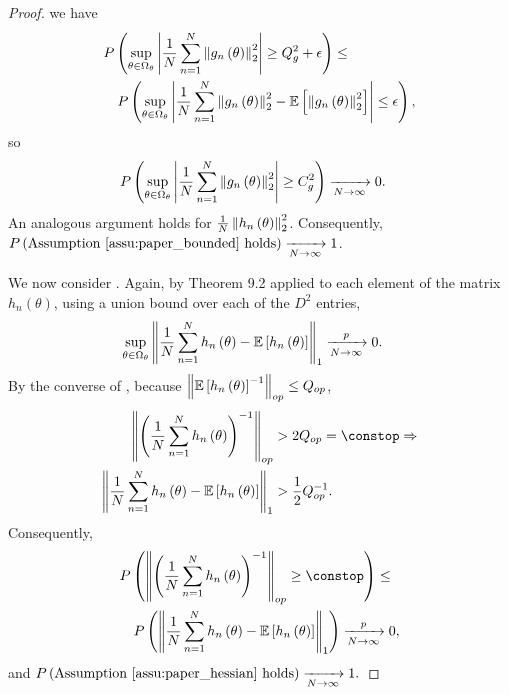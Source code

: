 \begin{proof}
we have
\begin{align*}
 & P\left(\sup_{\theta\in\Omega_{\theta}}\left|\frac{1}{N}\sum_{n=1}^{N}\left\Vert g_{n}\left(\theta\right)\right\Vert_{2}^{2}\right|\ge Q_{g}^{2}+\epsilon\right)\le\\
 & \quad P\left(\sup_{\theta\in\Omega_{\theta}}\left|\frac{1}{N}\sum_{n=1}^{N}\left\Vert g_{n}\left(\theta\right)\right\Vert_{2}^{2}-\mathbb{E}\left[\left\Vert g_{n}\left(\theta\right)\right\Vert_{2}^{2}\right]\right|\le\epsilon\right),
\end{align*}
so
\begin{align*}
P\left(\sup_{\theta\in\Omega_{\theta}}\left|\frac{1}{N}\sum_{n=1}^{N}\left\Vert g_{n}\left(\theta\right)\right\Vert_{2}^{2}\right|\ge C_{g}^{2}\right) & \xrightarrow[N\rightarrow\infty]{}0.
\end{align*}
An analogous argument holds for $\frac{1}{N}\left\Vert h_{n}\left(\theta\right)\right\Vert_{2}^{2}$.
Consequently, $P\left(\textrm{Assumption \ref{assu:paper_bounded} holds}\right)\xrightarrow[N\rightarrow\infty]{}1$.

We now consider . Again, by \citet{keener:2011:theoretical} Theorem 9.2
applied to each element of the matrix $h_{n}\left(\theta\right)$,
using a union bound over each of the $D^{2}$ entries,
\begin{align*}
\sup_{\theta\in\Omega_{\theta}}\left\Vert \frac{1}{N}\sum_{n=1}^{N}h_{n}\left(\theta\right)-\mathbb{E}\left[h_{n}\left(\theta\right)\right]\right\Vert_{1} & \xrightarrow[N\rightarrow\infty]{p}0.
\end{align*}
By the converse of , because
$\left\Vert \mathbb{E}\left[h_{n}\left(\theta\right)\right]^{-1}\right\Vert_{op}\le Q_{op}$,
\begin{align*}
\norm{\left(\frac{1}{N}\sum_{n=1}^{N}h_{n}\left(\theta\right)\right)^{-1}}_{op} & >2Q_{op}=\constop\Rightarrow\\
\norm{\frac{1}{N}\sum_{n=1}^{N}h_{n}\left(\theta\right)-\mbe\left[h_{n}\left(\theta\right)\right]}_{1} & >\frac{1}{2}Q_{op}^{-1}.
\end{align*}
Consequently,
\begin{align*}
 & P\left(\norm{\left(\frac{1}{N}\sum_{n=1}^{N}h_{n}\left(\theta\right)\right)^{-1}}_{op}\ge\constop\right)\le\\
 & \quad P\left(\norm{\frac{1}{N}\sum_{n=1}^{N}h_{n}\left(\theta\right)-\mbe\left[h_{n}\left(\theta\right)\right]}_{1}\right)\xrightarrow[N\rightarrow\infty]{p}0,
\end{align*}
and $P\left(\textrm{Assumption \ref{assu:paper_hessian} holds}\right)\xrightarrow[N\rightarrow\infty]{}1.$


\end{proof}
